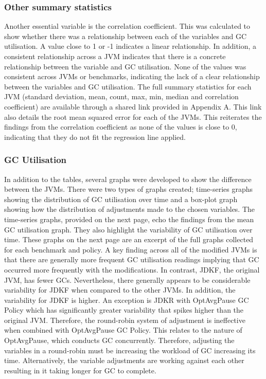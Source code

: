 \subsubsection{Other summary statistics}
Another essential variable is the correlation coefficient. This was
calculated to show whether there was a relationship between each of the
variables and GC utilisation. A value close to 1 or -1 indicates a
linear relationship. In addition, a consistent relationship across a JVM
indicates that there is a concrete relationship between the variable and
GC utilisation. None of the values was consistent across JVMs or
benchmarks, indicating the lack of a clear relationship between the
variables and GC utilisation. 
\newline\newline
The full summary statistics for each JVM
(standard deviation, mean, count, max, min, median and correlation
coefficient) are available through a shared link provided in Appendix A. This link also details
the root mean squared error for each of the JVMs. This reiterates the
findings from the correlation coefficient as none of the values is close
to 0, indicating that they do not fit the regression line applied. 
\subsubsection{GC Utilisation}
In
addition to the tables, several graphs were developed to show the
difference between the JVMs. There were two types of graphs created;
time-series graphs showing the distribution of GC utilisation over time
and a box-plot graph showing how the distribution of adjustments made to
the chosen variables. The time-series graphs, provided on the next page, echo the findings from the mean GC utilisation graph. They also highlight the variability of GC utilisation over time.  These graphs on the next page are an excerpt of the full graphs collected for each
benchmark and policy. A key finding across all of the modified
JVMs is that there are generally more frequent GC utilisation readings
implying that GC occurred more frequently with the modifications. In
contrast, JDKF, the original JVM, has fewer GCs.
\newline\newline
Nevertheless, there generally appears to be considerable variability for
JDKF when compared to the other JVMs. In addition, the variability for
JDKF is higher. An exception is JDKR with OptAvgPause GC Policy which
has significantly greater variability that spikes higher than the
original JVM. Therefore, the round-robin system of adjustment is
ineffective when combined with OptAvgPause GC Policy. This relates to
the nature of OptAvgPause, which conducts GC concurrently. Therefore,
adjusting the variables in a round-robin must be increasing the workload
of GC increasing its time. Alternatively, the variable adjustments are
working against each other resulting in it taking longer for GC to
complete.
